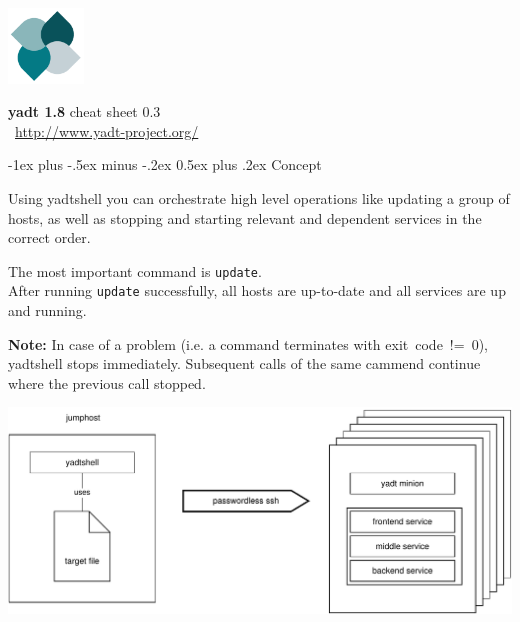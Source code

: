 \documentclass[10pt,landscape]{article}
\makeatletter
\renewcommand{\section}{\@startsection{section}{1}{0mm}%
                                {-1ex plus -.5ex minus -.2ex}%
                                {0.5ex plus .2ex}%
                                {\normalfont\large\bfseries}}
\newcommand{\note}[1]{\medskip\textbf{Note:} {#1}\medskip}
\makeatother
\begin{document}
\raggedright
\footnotesize
\begin{multicols}{3}


\setlength{\premulticols}{1pt}
\setlength{\postmulticols}{1pt}
\setlength{\multicolsep}{1em}
\setlength{\columnsep}{1em}

\includegraphics[width=2cm,valign=t]{res/yadtlogo}%
\hfill%
\begin{minipage}[t]{5cm}
{\Large{\textbf{yadt 1.8}}}\hfill
\textcolor{faded}{cheat sheet 0.3}\\[1em]
~\hfill\href{http://www.yadt-project.org/}{http://www.yadt-project.org/}
\end{minipage}


\section{Concept}

Using yadtshell you can orchestrate high level operations like updating
a group of hosts, as well as stopping and starting relevant and dependent
services in the correct order.
\medskip

The most important command is \verb+update+.\\
After running \verb+update+ successfully, all hosts are up-to-date and
all services are up and running.

\note{In case of a problem (i.e. a command terminates with exit~code~!=~0),
yadtshell stops immediately. Subsequent calls of the same cammend continue
where the previous call stopped.}

\includegraphics[width=\linewidth]{res/concept}


\end{multicols}
\end{document}
